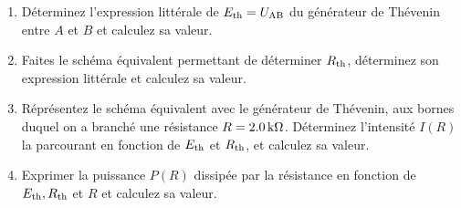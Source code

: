 \documentclass[10pt,a4paper]{article}
\begin{document}
\begin{enumerate}[label=\color{brandeisblue}\arabic*), resume]
    \item Déterminez l'expression littérale de $E _{\text{th}} = U _{\text{AB}}$ du
        générateur de Thévenin entre $A$ et $B$ et calculez sa valeur.
        \vspace{3cm}
    \item Faites le schéma équivalent permettant de déterminer $R _{\text{th}}$,
        déterminez son expression littérale et calculez sa valeur.
        \vspace{3cm}
    \item Réprésentez le schéma équivalent avec le générateur de Thévenin,
        aux bornes duquel on a branché une résistance $R = \SI{2.0}{k\Omega}$.
        Déterminez l'intensité $I(R)$ la parcourant en fonction de $E _{\text{th}}$
        et $R _{\text{th}}$, et calculez sa valeur.
        \vspace{3cm}
    \item Exprimer la puissance $P(R)$ dissipée par la résistance en fonction de
        $E _{\text{th}}, R _{\text{th}}$ et $R$ et calculez sa valeur.
\end{enumerate}
\end{document}
